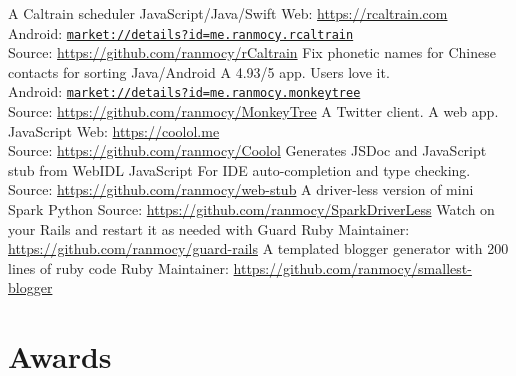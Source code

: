 \documentclass[]{friggeri-cv} %
\begin{document}
\begin{entrylist}
  {A Caltrain scheduler}
  {JavaScript/Java/Swift}
  {
    Web: \url{https://rcaltrain.com}\\
    Android: \href{https://play.google.com/store/apps/details?id=me.ranmocy.rcaltrain}{\texttt{market://details?id=me.ranmocy.rcaltrain}}\\
    Source: \url{https://github.com/ranmocy/rCaltrain}
  }
  {Fix phonetic names for Chinese contacts for sorting}
  {Java/Android}
  {
    A 4.93/5 app. Users love it.\\
    Android: \href{https://play.google.com/store/apps/details?id=me.ranmocy.monkeytree}{\texttt{market://details?id=me.ranmocy.monkeytree}}\\
    Source: \url{https://github.com/ranmocy/MonkeyTree}
  }
  {A Twitter client. A web app.}
  {JavaScript}
  {
    Web: \url{https://coolol.me}\\
    Source: \url{https://github.com/ranmocy/Coolol}
  }
  {Generates JSDoc and JavaScript stub from WebIDL}
  {JavaScript}
  {
    For IDE auto-completion and type checking.\\
    Source: \url{https://github.com/ranmocy/web-stub}
  }
  {A driver-less version of mini Spark}
  {Python}
  {
    Source: \url{https://github.com/ranmocy/SparkDriverLess}
  }
  {Watch on your Rails and restart it as needed with Guard}
  {Ruby}
  {
    Maintainer: \url{https://github.com/ranmocy/guard-rails}
  }
  {A templated blogger generator with 200 lines of ruby code}
  {Ruby}
  {
    Maintainer: \url{https://github.com/ranmocy/smallest-blogger}
  }
\end{entrylist}


\section{Awards}
\end{document}
